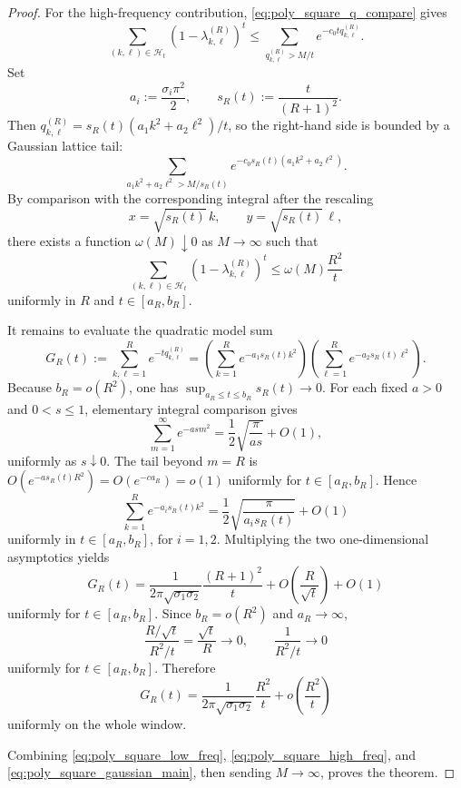 \documentclass[reqno]{amsart}
\numberwithin{equation}{section}
\theoremstyle{definition}
\theoremstyle{remark}
\begin{document}
\begin{proof}
For the high-frequency contribution, \eqref{eq:poly_square_q_compare} gives
\[
  \sum_{(k,\ell)\in\mathcal H_t}(1-\lambda_{k,\ell}^{(R)})^t
  \le
  \sum_{q_{k,\ell}^{(R)}>M/t} e^{-c_0 t q_{k,\ell}^{(R)}}.
\]
Set
\[
  a_i:=\frac{\sigma_i\pi^2}{2},
  \qquad
  s_R(t):=\frac{t}{(R+1)^2}.
\]
Then $q_{k,\ell}^{(R)}=s_R(t)(a_1k^2+a_2\ell^2)/t$, so the right-hand side is bounded by a Gaussian lattice tail:
\[
  \sum_{a_1k^2+a_2\ell^2> M/s_R(t)}
  e^{-c_0 s_R(t)(a_1k^2+a_2\ell^2)}.
\]
By comparison with the corresponding integral after the rescaling
\[
  x=\sqrt{s_R(t)}\,k,
  \qquad
  y=\sqrt{s_R(t)}\,\ell,
\]
there exists a function $\omega(M)\downarrow0$ as $M\to\infty$ such that
\begin{equation}\label{eq:poly_square_high_freq}
  \sum_{(k,\ell)\in\mathcal H_t}(1-\lambda_{k,\ell}^{(R)})^t
  \le
  \omega(M)\frac{R^2}{t}
\end{equation}
uniformly in $R$ and $t\in[a_R,b_R]$.

It remains to evaluate the quadratic model sum
\[
  G_R(t):=\sum_{k,\ell=1}^R e^{-t q_{k,\ell}^{(R)}}
  =
  \left(
    \sum_{k=1}^R e^{-a_1 s_R(t)k^2}
  \right)
  \left(
    \sum_{\ell=1}^R e^{-a_2 s_R(t)\ell^2}
  \right).
\]
Because $b_R=o(R^2)$, one has $\sup_{a_R\le t\le b_R}s_R(t)\to0$. For each fixed $a>0$ and $0<s\le1$, elementary integral comparison gives
\[
  \sum_{m=1}^\infty e^{-a s m^2}
  =
  \frac12\sqrt{\frac{\pi}{a s}}+O(1),
\]
uniformly as $s\downarrow0$. The tail beyond $m=R$ is $O(e^{-a s_R(t)R^2})=O(e^{-c a_R})=o(1)$ uniformly for $t\in[a_R,b_R]$. Hence
\[
  \sum_{k=1}^R e^{-a_i s_R(t)k^2}
  =
  \frac12\sqrt{\frac{\pi}{a_i s_R(t)}}+O(1)
\]
uniformly in $t\in[a_R,b_R]$, for $i=1,2$. Multiplying the two one-dimensional asymptotics yields
\[
  G_R(t)
  =
  \frac{1}{2\pi\sqrt{\sigma_1\sigma_2}}\frac{(R+1)^2}{t}
  + O\!\left(\frac{R}{\sqrt t}\right)+O(1)
\]
uniformly for $t\in[a_R,b_R]$. Since $b_R=o(R^2)$ and $a_R\to\infty$,
\[
  \frac{R/\sqrt t}{R^2/t}=\frac{\sqrt t}{R}\longrightarrow0,
  \qquad
  \frac{1}{R^2/t}\longrightarrow0
\]
uniformly for $t\in[a_R,b_R]$. Therefore
\begin{equation}\label{eq:poly_square_gaussian_main}
  G_R(t)
  =
  \frac{1}{2\pi\sqrt{\sigma_1\sigma_2}}\frac{R^2}{t}
  + o\!\left(\frac{R^2}{t}\right)
\end{equation}
uniformly on the whole window.

Combining \eqref{eq:poly_square_low_freq}, \eqref{eq:poly_square_high_freq}, and \eqref{eq:poly_square_gaussian_main}, then sending $M\to\infty$, proves the theorem.
\end{proof}
\end{document}

